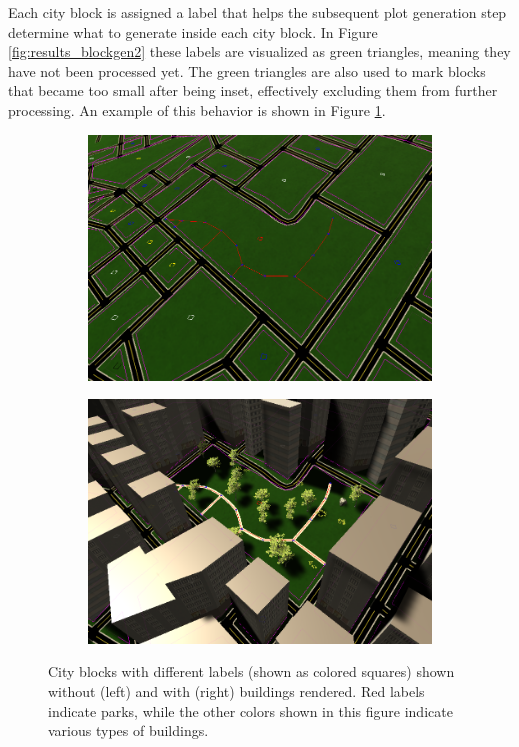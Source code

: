 Each city block is assigned a label that helps the subsequent plot generation step determine what to generate inside each city block.
In Figure \ref{fig:results_blockgen2} these labels are visualized as green triangles, meaning they have not been processed yet.
The green triangles are also used to mark blocks that became too small after being inset, effectively excluding them from further processing.
An example of this behavior is shown in Figure \ref{fig:results_blockgen3}.

\begin{figure}[h!]
  \centering
  \begin{subfigure}[b]{0.469\textwidth}
    \includegraphics[width=\textwidth]{figure/results/blockgen3.png}
  \end{subfigure}
  \quad
  \begin{subfigure}[b]{0.471\textwidth}
    \includegraphics[width=\textwidth]{figure/results/blockgen4.png}
  \end{subfigure}

  \caption{City blocks with different labels (shown as colored squares) shown without (left) and with (right) buildings rendered. Red labels indicate parks, while the other colors shown in this figure indicate various types of buildings.}
  \label{fig:results_blockgen3}
\end{figure}

